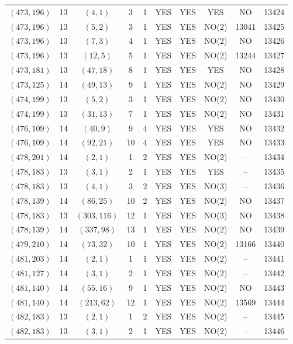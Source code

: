 \begin{longtable}{|c|c|c|c|c|c|c|c|c|c|}
$(473, 196)$ & 13 & $(4, 1)$ & 3 & 1 & YES & YES & YES & NO & 13424\\
$(473, 196)$ & 13 & $(5, 2)$ & 3 & 1 & YES & YES & NO(2) & 13041 & 13425\\
$(473, 196)$ & 13 & $(7, 3)$ & 4 & 1 & YES & YES & NO(2) & NO & 13426\\
$(473, 196)$ & 13 & $(12, 5)$ & 5 & 1 & YES & YES & NO(2) & 13244 & 13427\\
$(473, 181)$ & 13 & $(47, 18)$ & 8 & 1 & YES & YES & YES & NO & 13428\\
$(473, 125)$ & 14 & $(49, 13)$ & 9 & 1 & YES & YES & NO(2) & NO & 13429\\
$(474, 199)$ & 13 & $(5, 2)$ & 3 & 1 & YES & YES & NO(2) & NO & 13430\\
$(474, 199)$ & 13 & $(31, 13)$ & 7 & 1 & YES & YES & NO(2) & NO & 13431\\
$(476, 109)$ & 14 & $(40, 9)$ & 9 & 4 & YES & YES & YES & NO & 13432\\
$(476, 109)$ & 14 & $(92, 21)$ & 10 & 4 & YES & YES & YES & NO & 13433\\
$(478, 201)$ & 14 & $(2, 1)$ & 1 & 2 & YES & YES & NO(2) & -- & 13434\\
$(478, 183)$ & 13 & $(3, 1)$ & 2 & 1 & YES & YES & YES & -- & 13435\\
$(478, 183)$ & 13 & $(4, 1)$ & 3 & 2 & YES & YES & NO(3) & -- & 13436\\
$(478, 139)$ & 14 & $(86, 25)$ & 10 & 2 & YES & YES & NO(2) & NO & 13437\\
$(478, 183)$ & 13 & $(303, 116)$ & 12 & 1 & YES & YES & NO(3) & NO & 13438\\
$(478, 139)$ & 14 & $(337, 98)$ & 13 & 1 & YES & YES & NO(2) & NO & 13439\\
$(479, 210)$ & 14 & $(73, 32)$ & 10 & 1 & YES & YES & NO(2) & 13166 & 13440\\
$(481, 203)$ & 14 & $(2, 1)$ & 1 & 1 & YES & YES & NO(2) & -- & 13441\\
$(481, 127)$ & 14 & $(3, 1)$ & 2 & 1 & YES & YES & NO(2) & -- & 13442\\
$(481, 140)$ & 14 & $(55, 16)$ & 9 & 1 & YES & YES & NO(2) & NO & 13443\\
$(481, 140)$ & 14 & $(213, 62)$ & 12 & 1 & YES & YES & NO(2) & 13569 & 13444\\
$(482, 183)$ & 13 & $(2, 1)$ & 1 & 2 & YES & YES & NO(2) & -- & 13445\\
$(482, 183)$ & 13 & $(3, 1)$ & 2 & 1 & YES & YES & NO(2) & -- & 13446\\

\end{longtable}
